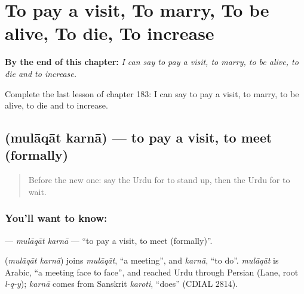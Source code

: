 
\chapter{To pay a visit, To marry, To be alive, To die, To increase}
\label{ch:ur-to-pay-a-visit-to-marry-to-be-alive-to-die-to-increase}

\begin{chapteropening}
\textbf{By the end of this chapter:} \emph{I can say to pay a visit, to marry, to be alive, to die and to increase.}

Complete the last lesson of chapter 183: I can say to pay a visit, to marry, to be alive, to die and to increase.
\end{chapteropening}

\section[\texorpdfstring{\ur{ملاقات} \ur{کرنا} (mulāqāt karnā)}{ملاقات کرنا (mulāqāt karnā)}]{  (mulāqāt karnā) — to pay a visit, to meet (formally)}

\label{lesson:UR-C183-mulaqat-karna}



\begin{quote}
Before the new one: say the Urdu for to stand up, then the Urdu for to wait.
\end{quote}

\subsection*{You'll want to know:  }
\textbf{ } — \emph{mulāqāt karnā} — \textquotedblleft{}to pay a visit, to meet (formally)\textquotedblright{}.

\begin{cousinweb}
\textbf{ } (\emph{mulāqāt karnā}) joins \emph{mulāqāt}, \textquotedblleft{}a meeting\textquotedblright{}, and \emph{karnā}, \textquotedblleft{}to do\textquotedblright{}. \emph{mulāqāt} is Arabic, \textquotedblleft{}a meeting face to face\textquotedblright{}, and reached Urdu through Persian (Lane, root \emph{l-q-y}); \emph{karnā} comes from Sanskrit \emph{karoti}, \textquotedblleft{}does\textquotedblright{} (CDIAL 2814).
\end{cousinweb}


